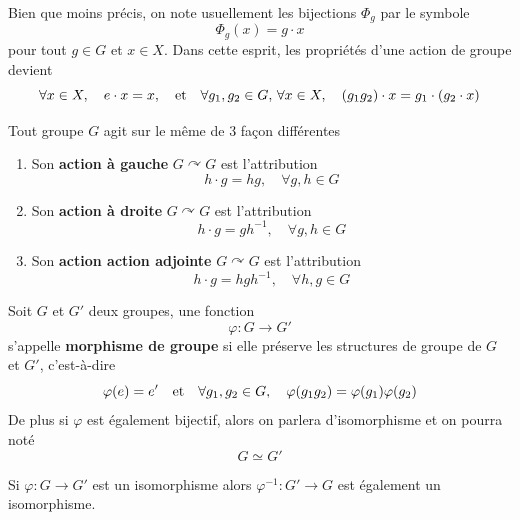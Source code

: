 \begin{remarque}
	Bien que moins précis, on note usuellement les bijections $\Phi_g$ par le symbole
	\[
	\Phi_g(x) = g \cdot x
	\]
	pour tout $g \in G$ et $x \in X$. Dans cette esprit, les propriétés d'une action de groupe devient
	\[
	\forall x \in X, \quad e \cdot x = x, \quad \text{et} \quad \forall g_1, g_2 \in G, \, \forall x \in X, \quad (g_1 g_2) \cdot x = g_1 \cdot (g_2 \cdot x)
	\]
\end{remarque}

\begin{exemple}
	Tout groupe $G$ agit sur le même de 3 façon différentes
	\begin{enumerate}
		\item Son \textbf{action à gauche} $G \curvearrowright G$ est l'attribution
		\[
		h \cdot g = hg, \quad \forall g,h \in G
		\]
		\item Son \textbf{action à droite} $G \curvearrowright G$ est l'attribution
		\[
		h \cdot g = g h^{-1}, \quad \forall g,h \in G
		\]	
		\item Son \textbf{action action adjointe} $G \curvearrowright G$ est l'attribution
		\[
		h \cdot g = h g h^{-1}, \quad \forall h,g \in G
		\]
	\end{enumerate}
\end{exemple}

\begin{definition} \label{def: Morphisme de groupe}
	Soit $G$ et $G'$ deux groupes, une fonction
	\[
	\varphi : G \to G'
	\]
	s'appelle \textbf{morphisme de groupe} si elle préserve les structures de groupe de $G$ et $G'$, c'est-à-dire
	\[
	\varphi(e) = e' \quad \text{et} \quad \forall g_1, g_2 \in G, \quad \varphi(g_1 g_2) = \varphi(g_1) \varphi(g_2)
	\]
	De plus si $\varphi$ est également bijectif, alors on parlera d'isomorphisme et on pourra noté
	\[
	G \simeq G'
	\]
\end{definition}

\begin{proposition}
	Si $\varphi : G \to G'$ est un isomorphisme alors $\varphi^{-1} : G' \to G$ est également un isomorphisme.
\end{proposition}

